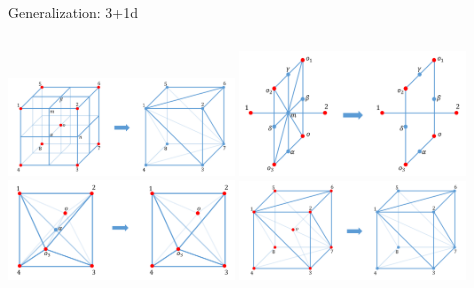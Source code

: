 \documentclass{fdubeamer}
\newcommand{\1}{\mathbb{1}}
\begin{document}
\begin{frame}{Generalization: 3+1d}
\begin{columns}[c]
    \centering
    \includegraphics[width=0.45\textwidth]{images/holographic/rg-3+1d.png} \quad
    \includegraphics[width=0.45\textwidth]{images/holographic/rg-3+1d-step-1.png} \\
    \includegraphics[width=0.45\textwidth]{images/holographic/rg-3+1d-step-2.png} \quad
    \includegraphics[width=0.45\textwidth]{images/holographic/rg-3+1d-step-3.png}

\end{columns}

\end{frame}
\end{document}
